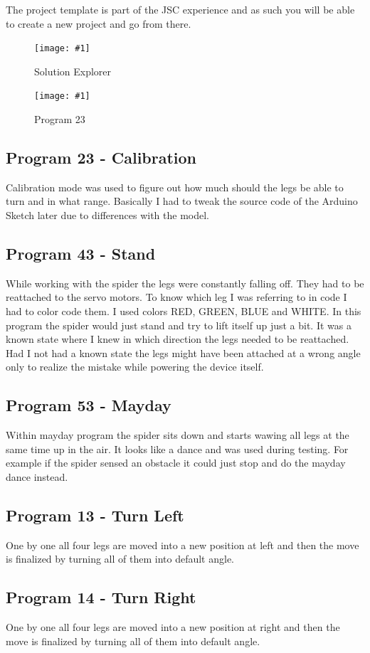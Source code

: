 \documentclass[12pt,leqno]{book}
\newcommand{\png}[1]{\texttt{[image: \#1]}}
\newcommand{\figpng}[2]{\begin{figure}[htb]\centering\png{#1}\caption{#2}\end{figure}}
\begin{document}
The project template is part of the JSC experience and as such you will be able to create a new project and go from there.



\figpng{Images/SpiderModel_-_Microsoft_Visual_Studio-2012-03-14_15.39.19}
{Solution Explorer}

\figpng{Images/A_string_from_JavaScript._-_Google_Chrome-2012-03-14_16.12.04}
{Program 23}



\subsection{Program 23 - Calibration}
Calibration mode was used to figure out how much should the legs be able to turn and in what range. Basically I had to tweak the
source code of the Arduino Sketch later due to differences with the model.
\subsection{Program 43 - Stand}
While working with the spider the legs were constantly falling off. They had to be reattached to the servo motors. To know which
leg I was referring to in code I had to color code them. I used colors RED, GREEN, BLUE and WHITE. In this program the spider 
would just stand and try to lift itself up just a bit. It was a known state where I knew in which direction the legs needed to be reattached. Had I not had a known state the legs might have been attached at a wrong angle only to realize the mistake while
powering the device itself.
\subsection{Program 53 - Mayday}
Within mayday program the spider sits down and starts wawing all legs at the same time up in the air. It looks like a dance and was used during testing. For example if the spider sensed an obstacle it could just stop and do the mayday dance instead.
\subsection{Program 13 - Turn Left}
One by one all four legs are moved into a new position at left and then the move is finalized by turning all of them into default angle.
\subsection{Program 14 - Turn Right}
One by one all four legs are moved into a new position at right and then the move is finalized by turning all of them into default angle.
\end{document}
